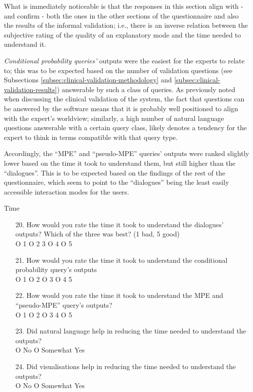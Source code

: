 What is immediately noticeable is that the responses in this section align with - and confirm - both the ones in the other sections of the questionnaire and also the results of the informal validation; i.e., there is an inverse relation between the subjective rating of the quality of an explanatory mode and the time needed to understand it.

\textit{Conditional probability queries'} outputs were the easiest for the experts to relate to; this was to be expected based on the number of validation questions (see Subsections \ref{subsec:clinical-validation-methodology} and \ref{subsec:clinical-validation-results}) answerable by such a class of queries.
As previously noted when discussing the clinical validation of the system, the fact that questions can be answered by the software means that it is probably well positioned to align with the expert's worldview; similarly, a high number of natural language questions answerable with a certain query class, likely denotes a tendency for the expert to think in terms compatible with that query type.

Accordingly, the \enquote{MPE} and \enquote{pseudo-MPE} queries' outputs were ranked slightly lower based on the time it took to understand them, but still higher than the \enquote{dialogues}.
This is to be expected based on the findings of the rest of the questionnaire, which seem to point to the \enquote{dialogues} being the least easily accessible interaction modes for the users.

\begin{mdframed}
		{\Large Time}
	\begin{enumerate}[resume]
		\item[20.] How would you rate the time it took to understand the dialogues' outputs?  Which of the three was best? (1 bad, 5 good) \\
		O 1 O 2  3 O 4 O 5
		\item[21.] How would you rate the time it took to understand the conditional probability query's outputs \\
		O 1 O 2 O 3 O 4  5
		\item[22.] How would you rate the time it took to understand the MPE and \enquote{pseudo-MPE} query's outputs? \\
		O 1 O 2 O 3  4 O 5
		\item[23.] Did natural language help in reducing the time needed to understand the outputs? \\
		O No O Somewhat  Yes
		\item[24.] Did visualisations help in reducing the time needed to understand the outputs? \\
		O No O Somewhat  Yes
	\end{enumerate}
	\label{ques:time}
\end{mdframed}

